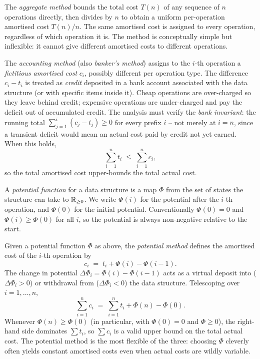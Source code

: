 \begin{definition}
\label{def:aggregate_method}
The \emph{aggregate method} bounds the total cost $T(n)$ of any sequence of $n$ operations directly, then divides by $n$ to obtain a uniform per-operation amortised cost $T(n)/n$. The same amortised cost is assigned to every operation, regardless of which operation it is. The method is conceptually simple but inflexible: it cannot give different amortised costs to different operations.
\end{definition}

\begin{definition}
\label{def:accounting_method}
The \emph{accounting method} (also \emph{banker's method}) assigns to the $i$-th operation a \emph{fictitious amortised cost} $c_i$, possibly different per operation type. The difference $c_i - t_i$ is treated as \emph{credit} deposited in a bank account associated with the data structure (or with specific items inside it). Cheap operations are over-charged so they leave behind credit; expensive operations are under-charged and pay the deficit out of accumulated credit. The analysis must verify the \emph{bank invariant}: the running total $\sum_{j=1}^{i}(c_j - t_j) \ge 0$ for every prefix $i$ -- not merely at $i = n$, since a transient deficit would mean an actual cost paid by credit not yet earned. When this holds,
\[
  \sum_{i=1}^{n} t_i \;\le\; \sum_{i=1}^{n} c_i,
\]
so the total amortised cost upper-bounds the total actual cost.
\end{definition}

\begin{definition}
\label{def:potential_function}
A \emph{potential function} for a data structure is a map $\Phi$ from the set of states the structure can take to $\mathbb{R}_{\ge 0}$. We write $\Phi(i)$ for the potential after the $i$-th operation, and $\Phi(0)$ for the initial potential. Conventionally $\Phi(0) = 0$ and $\Phi(i) \ge \Phi(0)$ for all $i$, so the potential is always non-negative relative to the start.
\end{definition}

\begin{definition}
\label{def:potential_method}
Given a potential function $\Phi$ as above, the \emph{potential method} defines the amortised cost of the $i$-th operation by
\[
  c_i \;=\; t_i + \Phi(i) - \Phi(i-1).
\]
The change in potential $\Delta\Phi_i = \Phi(i) - \Phi(i-1)$ acts as a virtual deposit into ($\Delta\Phi_i > 0$) or withdrawal from ($\Delta\Phi_i < 0$) the data structure. Telescoping over $i = 1, \dots, n$,
\[
  \sum_{i=1}^{n} c_i \;=\; \sum_{i=1}^{n} t_i + \Phi(n) - \Phi(0).
\]
Whenever $\Phi(n) \ge \Phi(0)$ (in particular, with $\Phi(0) = 0$ and $\Phi \ge 0$), the right-hand side dominates $\sum t_i$, so $\sum c_i$ is a valid upper bound on the total actual cost. The potential method is the most flexible of the three: choosing $\Phi$ cleverly often yields constant amortised costs even when actual costs are wildly variable.
\end{definition}

